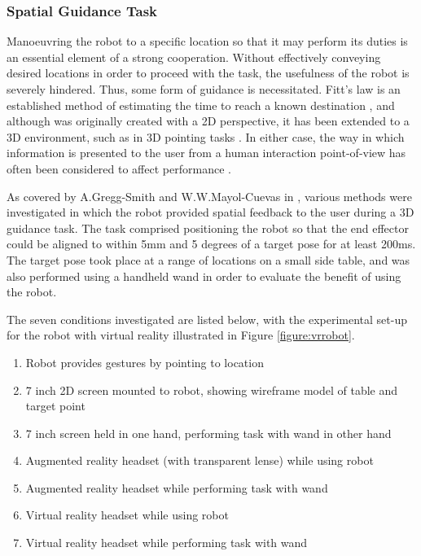\documentclass[11pt]{article}
\begin{document}
\subsubsection{Spatial Guidance Task}

Manoeuvring the robot to a specific location so that it may perform its duties is an essential element of a strong cooperation. Without effectively conveying desired locations in order to proceed with the task, the usefulness of the robot is severely hindered. Thus, some form of guidance is necessitated. Fitt's law is an established method of estimating the time to reach a known destination \cite{fitts1954}, and although was originally created with a 2D perspective, it has been extended to a 3D environment, such as in 3D pointing tasks \cite{Cha2013}. In either case, the way in which information is presented to the user from a human interaction point-of-view has often been considered to affect performance \cite{soukoreff2004} \cite{MOTOYUKI1995}. 
  
As covered by A.Gregg-Smith and W.W.Mayol-Cuevas in \cite{GreggSmithFeedback}, various methods were investigated in which the robot provided spatial feedback to the user during a 3D guidance task. The task comprised positioning the robot so that the end effector could be aligned to within 5mm and 5 degrees of a target pose for at least 200ms. The target pose took place at a range of locations on a small side table, and was also performed using a handheld wand in order to evaluate the benefit of using the robot.

The seven conditions investigated are listed below, with the experimental set-up for the robot with virtual reality illustrated in Figure \ref{figure:vrrobot}.
\begin{enumerate}
\item{Robot provides gestures by pointing to location}
\item{7 inch 2D screen mounted to robot, showing wireframe model of table and target point}
\item{7 inch screen held in one hand, performing task with wand in other hand}
\item{Augmented reality headset (with transparent lense) while using robot}
\item{Augmented reality headset while performing task with wand}
\item{Virtual reality headset while using robot}
\item{Virtual reality headset while performing task with wand}
\end{enumerate}
\end{document}
